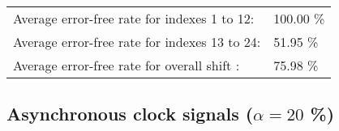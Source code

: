 \begin{table}[h]
\begin{center}
\begin{tabular}{|c|c|c|c|c|}
\end{tabular}


\flushleft
\begin{tabular}{l l}
Average error-free rate for indexes  1 to 12: & 100.00 \% \\
Average error-free rate for indexes 13 to 24: & 51.95 \% \\
Average error-free rate for overall shift   : & 75.98 \% \\

\end{tabular}


\end{center}
\end{table}

\pagebreak
\subsection{Asynchronous clock signals ($\alpha=20$ \%)}

